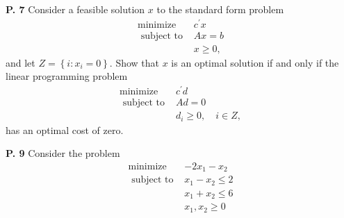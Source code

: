 \documentclass{article}
\begin{document}
\begin{jacklist}
\newpage
    \begin{framed} 
    \item [\textbf{P. 7}] Consider a feasible solution $x$ to the standard form problem 
        \begin{align*}
            \text{minimize} & c^{\prime} x \\
            \text { subject to } & A x=b \\
            & x \geq 0,
        \end{align*}
        and let $Z=\left\{i: x_{i}=0\right\}$. Show that $x$ is an optimal solution if and only if the linear programming problem
        \begin{align*}
            \operatorname{minimize} & c^{\prime} d \\
            \text { subject to } & A d=0 \quad \\
            & d_{i} \geq 0, \quad i \in Z,
        \end{align*}
        has an optimal cost of zero.
    \end{framed}

\newpage
    \begin{framed} 
    \item [\textbf{P. 9}] Consider the problem 
        \[\begin{array}{rc}
            \operatorname{minimize} & -2 x_{1}-x_{2} \\
            \text { subject to } & x_{1}-x_{2} \leq 2 \\
            & x_{1}+x_{2} \leq 6 \\
            & x_{1}, x_{2} \geq 0
        \end{array}\]
    \end{framed}
\end{jacklist}
\end{document}
